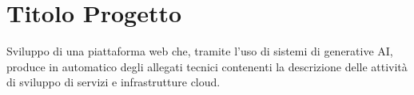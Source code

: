 \section*{Titolo Progetto}
    Sviluppo di una piattaforma web che, tramite l'uso di sistemi di generative AI, 
    produce in automatico degli allegati tecnici contenenti la descrizione delle attività di sviluppo di servizi e infrastrutture cloud.